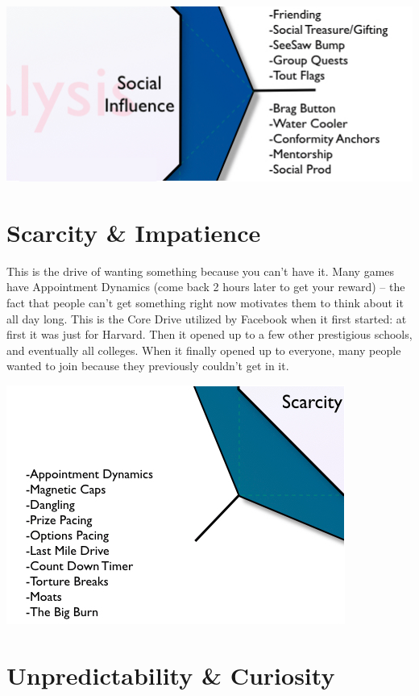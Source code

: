 \documentclass[
]{book}
\begin{document}
\begin{center}\includegraphics[width=0.75\linewidth]{assets/images/core-drive-5-social-influence-and-relatedness} \end{center}

\hypertarget{scarcity-impatience}{%
\section{Scarcity \& Impatience}\label{scarcity-impatience}}

This is the drive of wanting something because you can't have it. Many games have Appointment Dynamics (come back 2 hours later to get your reward) -- the fact that people can't get something right now motivates them to think about it all day long. This is the Core Drive utilized by Facebook when it first started: at first it was just for Harvard. Then it opened up to a few other prestigious schools, and eventually all colleges. When it finally opened up to everyone, many people wanted to join because they previously couldn't get in it.

\begin{center}\includegraphics[width=0.75\linewidth]{assets/images/core-drive-6-scarcity-and-impatience} \end{center}

\hypertarget{unpredictability-curiosity}{%
\section{Unpredictability \& Curiosity}\label{unpredictability-curiosity}}
\end{document}
